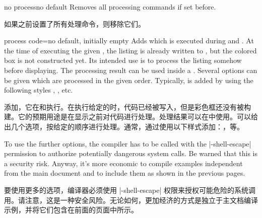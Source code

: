 \begin{docTcbKey}[][doc new=2014-11-14]{no process}{}{no default}
Removes all processing commands if set before.

如果之前设置了所有处理命令，则移除它们。
\end{docTcbKey}

\begin{docTcbKey}[][doc new=2014-11-14]{process code}{=}{no default, initially empty}
Adds  which is executed during 
and . At the time of executing the given ,
the listing is already written to , but
the colored box is not constructed yet.
Its intended use is to process the listing somehow before displaying.
The processing result can be used inside a .
Several  options can be given which are
processed in the given order.
Typically,  is added by using the following styles
, , etc.


添加，它在和执行。在执行给定的时，代码已经被写入，但是彩色框还没有被构建。它的预期用途是在显示之前对代码进行处理。处理结果可以在中使用。可以给出几个选项，按给定的顺序进行处理。通常，通过使用以下样式添加：，等。
\end{docTcbKey}

\begin{marker}
To use the further options, the compiler has to be called with the
|-shell-escape| permission to authorize potentially dangerous system calls.
Be warned that this is a security risk. Anyway, it's more economic to
compile examples independent from the main document and to include them as
shown in the previous pages.

要使用更多的选项，编译器必须使用 |-shell-escape| 权限来授权可能危险的系统调用。请注意，这是一种安全风险。无论如何，更加经济的方式是独立于主文档编译示例，并将它们包含在前面的页面中所示。
\end{marker}